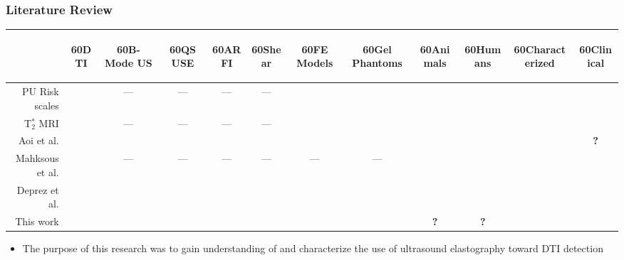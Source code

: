 \documentclass{beamer}
\newcommand{\rotHead}[1]{\begin{rotate}{60}#1\end{rotate}}
\newcommand{\cmark}{\color{ExecusharesBlue}\ding{51}}
\newcommand{\xmark}{\color{ExecusharesRed}\ding{55}}
\begin{document}
		\begin{frame}
			\frametitle{Literature Review}
			\begin{center}
				\vspace{1cm}
				\begin{tabular}{r|c|cccc|cccc|cc}
					& \rotHead{DTI} & \rotHead{B-Mode US} & \rotHead{QS USE} & \rotHead{ARFI} & \rotHead{Shear} & \rotHead{FE Models} & \rotHead{Gel Phantoms} & \rotHead{Animals} & \rotHead{Humans} & \rotHead{Characterized} & \rotHead{Clinical} \\
					\hline
					PU Risk scales & \xmark & --- & --- & --- & --- & \xmark & \xmark & \xmark & \cmark & \cmark & \cmark \\
					T$_2^*$ MRI & \cmark & --- & --- & --- & --- & \cmark & \cmark & \cmark& \cmark & \xmark & \xmark \\
					\hline
					Aoi et al. \cite{aoi08} & \cmark & \cmark & \xmark & \xmark & \xmark & \xmark & \xmark & \xmark & \cmark & \xmark & \color{ExecusharesBlue}\textbf{?} \\
					Mahksous et al. \cite{mahksous10} & \cmark & --- & --- & --- & --- & --- & --- & \cmark & \xmark & \xmark & \cmark \\
					Deprez et al. \cite{deprez11} & \cmark & \xmark & \cmark & \xmark & \xmark & \cmark & \cmark & \cmark & \xmark & \xmark & \cmark \\
					\hline
					This work & \cmark & \xmark & \cmark & \cmark & \cmark & \cmark & \cmark & \color{ExecusharesBlue}\textbf{?} & \color{ExecusharesBlue}\textbf{?} & \cmark & \cmark \\
				\end{tabular}
			\end{center}
			\begin{itemize}
				\item The \alert{purpose} of this research was to gain understanding of and characterize the use of ultrasound elastography toward DTI detection
			\end{itemize}
		\end{frame}

\end{document}
